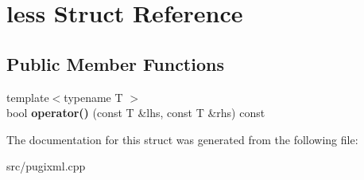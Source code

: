 \hypertarget{structless}{}\section{less Struct Reference}
\label{structless}
\subsection*{Public Member Functions}
\begin{DoxyCompactItemize}
\item 
\mbox{\label{structless_a68b5bb53559da9444217a81dac510f7d}} 
{\footnotesize template$<$typename T $>$ }\\bool {\bfseries operator()} (const T \&lhs, const T \&rhs) const
\end{DoxyCompactItemize}


The documentation for this struct was generated from the following file\+:\begin{DoxyCompactItemize}
\item 
src/pugixml.\+cpp\end{DoxyCompactItemize}
